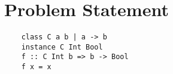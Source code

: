 \section{Problem Statement}
\begin{verbatim}
    class C a b | a -> b
    instance C Int Bool
    f :: C Int b => b -> Bool
    f x = x
\end{verbatim}
